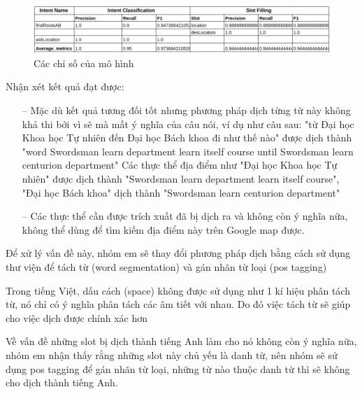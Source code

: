 \begin{figure}[htp]
    \centering
    \includegraphics[width=15cm]{images/metrics-dich-tung-t.png}
    \caption{Các chỉ số của mô hình}
    \label{fig:sodohethongchiduong}
\end{figure}
Nhận xét kết quả đạt được:
\begin{itemize}
    \item[--] Mặc dù kết quả tương đối tốt nhưng phương pháp dịch từng từ này không khả thi bởi vì sẽ mà mất ý nghĩa của câu nói, ví dụ như câu sau: "từ Đại học Khoa học Tự nhiên đến Đại học Bách khoa đi như thế nào" được dịch thành "word Swordsman learn department learn itself course until Swordsman learn centurion department" Các thực thể địa điểm như "Đại học Khoa học Tự nhiên" được dịch thành "Swordsman learn department learn itself course", "Đại học Bách khoa" dịch thành "Swordsman learn centurion department"
    \item[--] Các thực thể cần được trích xuất đã bị dịch ra và không còn ý nghĩa nữa, không thể dùng để tìm kiếm địa điểm này trên Google map được.
\end{itemize}

Để xử lý vấn đề này, nhóm em sẽ thay đổi phương pháp dịch bằng cách sử dụng thư viện để tách từ (word segmentation) và gán nhãn từ loại (pos tagging)

Trong tiếng Việt, dấu cách (space) không được sử dụng như 1 kí hiệu phân tách từ, nó chỉ có ý nghĩa phân tách các âm tiết với nhau. Do đó việc tách từ sẽ giúp cho việc dịch được chính xác hơn

Về vấn đề những slot bị dịch thành tiếng Anh làm cho nó không còn ý nghĩa nữa, nhóm em nhận thấy rằng những slot này chủ yếu là danh từ, nên nhóm sẽ sử dụng pos tagging để gán nhãn từ loại, những từ nào thuộc danh từ thì sẽ không cho dịch thành tiếng Anh.


